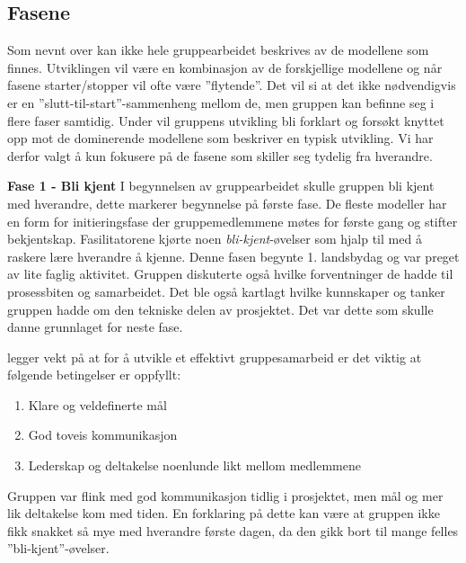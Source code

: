 \subsection{Fasene}
Som nevnt over kan ikke hele gruppearbeidet beskrives av de modellene som finnes. 
Utviklingen vil være en kombinasjon av de forskjellige modellene og når fasene starter/stopper vil ofte være ''flytende''.
Det vil si at det ikke nødvendigvis er en ''slutt-til-start''-sammenheng mellom de, men gruppen kan befinne seg i flere faser samtidig. 
Under vil gruppens utvikling bli forklart og forsøkt knyttet opp mot de dominerende modellene som beskriver en typisk utvikling. 
Vi har derfor valgt å kun fokusere på de fasene som skiller seg tydelig fra hverandre.
\vspace{\secspace}



\textbf{\Large Fase 1 - Bli kjent}
I begynnelsen av gruppearbeidet skulle gruppen bli kjent med hverandre, dette markerer begynnelse på første fase.
De fleste modeller har en form for initieringsfase der gruppemedlemmene møtes for første gang og stifter bekjentskap. 
Fasilitatorene kjørte noen \textit{bli-kjent}-øvelser som hjalp til med å raskere lære hverandre å kjenne. 
Denne fasen begynte 1. landsbydag og var preget av lite faglig aktivitet. 
Gruppen diskuterte også hvilke forventninger de hadde til prosessbiten og samarbeidet. 
Det ble også kartlagt hvilke kunnskaper og tanker gruppen hadde om den tekniske delen av prosjektet. 
Det var dette som skulle danne grunnlaget for neste fase. 

\citet{johnson} legger vekt på at for å utvikle et effektivt gruppesamarbeid er det viktig at følgende betingelser er oppfyllt:
\begin{enumerate}
    \item Klare og veldefinerte mål
    \item God toveis kommunikasjon
    \item Lederskap og deltakelse noenlunde likt mellom medlemmene
\end{enumerate} 
Gruppen var flink med god kommunikasjon tidlig i prosjektet, men mål og mer lik deltakelse kom med tiden. 
En forklaring på dette kan være at gruppen ikke fikk snakket så mye med hverandre første dagen, da den gikk bort til mange felles ''bli-kjent''-øvelser. 
\vspace{\secspace}

